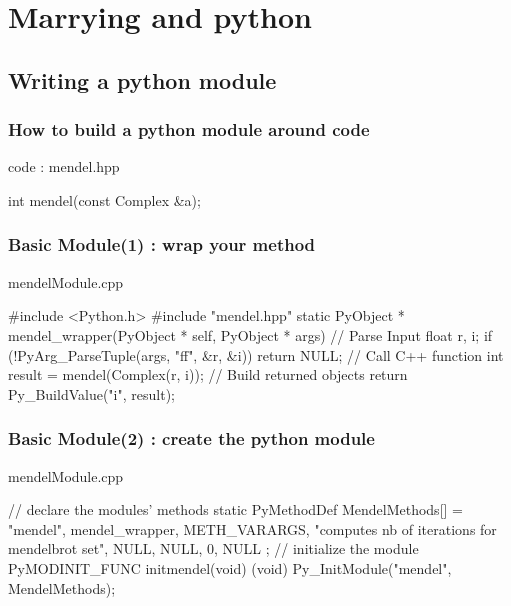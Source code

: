 \section{Marrying \cpp and python}

\subsection[module]{Writing a python module}

\begin{frame}[fragile]
  \frametitle{How to build a python module around \cpp code}
  \begin{block}{\cpp code : mendel.hpp}
    \begin{cppcode*}{}
      int mendel(const Complex &a);
    \end{cppcode*}
  \end{block}
\end{frame}
  
\begin{frame}[fragile]
  \frametitle{Basic Module(1) : wrap your method}
  \begin{block}{mendelModule.cpp}
    \begin{cppcode*}{}
      #include <Python.h>
      #include "mendel.hpp"      
      static PyObject * mendel_wrapper(PyObject * self,
                                       PyObject * args) {
        // Parse Input
        float r, i;
        if (!PyArg_ParseTuple(args, "ff", &r, &i))
          return NULL;
        // Call C++ function
        int result = mendel(Complex(r, i));
        // Build returned objects
        return Py_BuildValue("i", result);
      }
    \end{cppcode*}
  \end{block}
\end{frame}

\begin{frame}[fragile]
  \frametitle{Basic Module(2) : create the python module}
  \begin{block}{mendelModule.cpp}
    \begin{cppcode*}{}
      // declare the modules' methods
      static PyMethodDef MendelMethods[] = {
          {"mendel", mendel_wrapper, METH_VARARGS,
          "computes nb of iterations for mendelbrot set"},
          {NULL, NULL, 0, NULL}
      };
      // initialize the module
      PyMODINIT_FUNC initmendel(void) {
        (void) Py_InitModule("mendel", MendelMethods);
      }
    \end{cppcode*}
  \end{block}
\end{frame}

